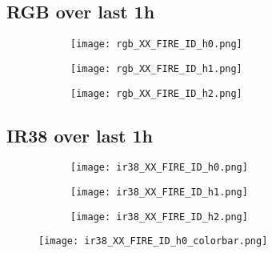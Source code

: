 \vspace{-1em}
\subsection*{RGB over last 1h}
\vspace{-1em}
\begin{figure}[H]
    \raggedright  %
    \begin{minipage}{0.96\textwidth}
    \begin{subfigure}[b]{0.32\textwidth}
        \centering
        \texttt{[image: rgb\_XX\_FIRE\_ID\_h0.png]} %
    \end{subfigure}
    \begin{subfigure}[b]{0.32\textwidth}
        \centering
        \texttt{[image: rgb\_XX\_FIRE\_ID\_h1.png]} %
    \end{subfigure}
    \begin{subfigure}[b]{0.32\textwidth}
        \centering
        \texttt{[image: rgb\_XX\_FIRE\_ID\_h2.png]} %
    \end{subfigure}
    \end{minipage}%
\end{figure}

\vspace{-1em}
\subsection*{IR38 over last 1h}
\vspace{-1em}
\begin{figure}[H]
    \raggedright  %
    \begin{minipage}{\textwidth}
        \begin{minipage}[t]{0.96\textwidth} %
            \begin{subfigure}[b]{0.32\textwidth}
                \centering
                \texttt{[image: ir38\_XX\_FIRE\_ID\_h0.png]}
            \end{subfigure}
            \begin{subfigure}[b]{0.32\textwidth}
                \centering
                \texttt{[image: ir38\_XX\_FIRE\_ID\_h1.png]}
            \end{subfigure}
            \begin{subfigure}[b]{0.32\textwidth}
                \centering
                \texttt{[image: ir38\_XX\_FIRE\_ID\_h2.png]}
            \end{subfigure}
        \end{minipage}%
        \begin{minipage}[t]{0.0384\textwidth}
            \raggedright
            \texttt{[image: ir38\_XX\_FIRE\_ID\_h0\_colorbar.png]}
        \end{minipage}
    \end{minipage}
\end{figure}


